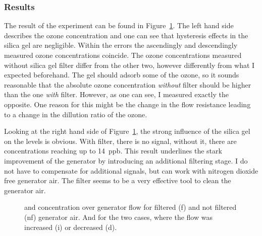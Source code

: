 \subsubsection{Results}
\label{sec:silica-results}

The result of the experiment can be found in
Figure~\ref{fig:o3-flow}. The left hand side describes the ozone
concentration and one can see that hysteresis effects in the silica gel
are negligible. Within the errors the ascendingly and descendingly
measured ozone concentrations coincide. The ozone concentrations
measured without silica gel filter differ from the other two, however
differently from what I expected beforehand. The gel should adsorb
some of the ozone, so it sounds reasonable that the absolute ozone
concentration \emph{without} filter should be higher than the one
\emph{with} filter. However, as one can see, I measured exactly the
opposite. One reason for this might be the change in the flow
resistance leading to a change in the dillution ratio of the ozone.

Looking at the right hand side of Figure~\ref{fig:o3-flow}, the
strong influence of the silica gel on the  levels is obvious. With
filter, there is no  signal, without it, there are concentrations
reaching up to \SI{14}{ppb}. This result underlines the stark
improvement of the generator by introducing an additional filtering
stage. I do not have to compensate for additional  signals,
but can work with nitrogen dioxide free generator air. The filter
seems to be a very effective tool to clean the generator air.

\begin{figure}[htbp]
  \centering
  
  \hfill
  
  \caption{ and  concentration over generator flow for
    filtered (f) and not filtered (nf) generator air. And for the two
    cases, where the flow was increased (i) or decreased (d).}
  \label{fig:o3-flow}
\end{figure}

